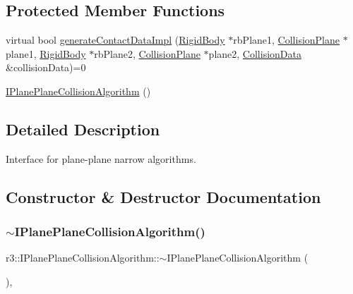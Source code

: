 \subsection*{Protected Member Functions}
\begin{DoxyCompactItemize}
\item 
virtual bool \mbox{\hyperlink{classr3_1_1_i_plane_plane_collision_algorithm_a708dec70f58b4476976dfea9921d1524}{generate\+Contact\+Data\+Impl}} (\mbox{\hyperlink{classr3_1_1_rigid_body}{Rigid\+Body}} $\ast$rb\+Plane1, \mbox{\hyperlink{classr3_1_1_collision_plane}{Collision\+Plane}} $\ast$plane1, \mbox{\hyperlink{classr3_1_1_rigid_body}{Rigid\+Body}} $\ast$rb\+Plane2, \mbox{\hyperlink{classr3_1_1_collision_plane}{Collision\+Plane}} $\ast$plane2, \mbox{\hyperlink{classr3_1_1_collision_data}{Collision\+Data}} \&collision\+Data)=0
\item 
\mbox{\hyperlink{classr3_1_1_i_plane_plane_collision_algorithm_a90114a1d9a03de817f6a00d0a054de09}{I\+Plane\+Plane\+Collision\+Algorithm}} ()
\end{DoxyCompactItemize}


\subsection{Detailed Description}
Interface for plane-\/plane narrow algorithms. 

\subsection{Constructor \& Destructor Documentation}
\mbox{\label{classr3_1_1_i_plane_plane_collision_algorithm_a93e78b07d3d296f30a5ab926a3a42323}} 
\subsubsection{\texorpdfstring{$\sim$\+I\+Plane\+Plane\+Collision\+Algorithm()}{~IPlanePlaneCollisionAlgorithm()}}
{\footnotesize\ttfamily r3\+::\+I\+Plane\+Plane\+Collision\+Algorithm\+::$\sim$\+I\+Plane\+Plane\+Collision\+Algorithm (\begin{DoxyParamCaption}{ }\end{DoxyParamCaption})\hspace{0.3cm}{\ttfamily [virtual]}, {\ttfamily [default]}}

